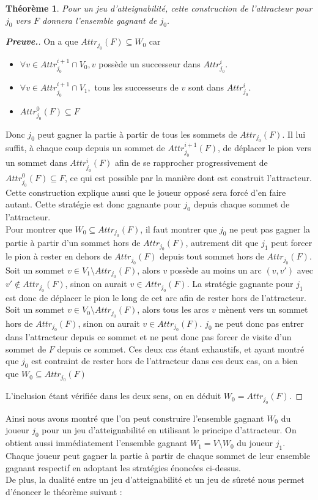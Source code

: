\documentclass[12pt,a4paper,oneside,titlepage]{report}
\newtheorem{thm}{Th\'eor\`eme}[section]
\newenvironment{demonstration}{\begin{proof}[\textnormal{\textbf{Preuve.}}]}{\end{proof}}
\begin{document}
\begin{thm} 
	Pour un jeu d'atteignabilité, cette construction de l'attracteur pour $j_0$ vers $F$ donnera l'ensemble gagnant de $j_0$.
\end{thm}
\begin{demonstration}{
On a que $Attr_{j_0}(F)\subseteq W_0 $ car
\begin{itemize}
\item $\forall v \in Attr_{j_0}^{i+1}\cap V_0, v$ possède un successeur dans $Attr_{j_0}^i$.
\item $\forall v \in Attr_{j_0}^{i+1}\cap V_1,$ tous les successeurs de $v$ sont dans $Attr_{j_0}^i$.
\item $Attr_{j_0}^0(F) \subseteq F$
\end{itemize}
Donc $j_0$ peut gagner la partie à partir de tous les sommets de $Attr_{j_0}(F)$. Il lui suffit, à chaque coup depuis un sommet de $Attr^{i+1}_{j_0}(F)$, de déplacer le pion vers un sommet dans $Attr^{i}_{j_0}(F)$ afin de se rapprocher progressivement de $Attr_{j_0}^0(F) \subseteq F$, ce qui est possible par la manière dont est construit l'attracteur. Cette construction explique aussi que le joueur opposé sera forcé d'en faire autant. Cette stratégie est donc gagnante pour $j_0$ depuis chaque sommet de l'attracteur.\\

\noindent Pour montrer que $W_0\subseteq Attr_{j_0}(F)$, il faut montrer que $j_0$ ne peut pas gagner la partie à partir d'un sommet hors de $Attr_{j_0}(F)$, autrement dit que $j_1$ peut forcer le pion à rester en dehors de $Attr_{j_0}(F)$ depuis tout sommet hors de $Attr_{j_0}(F)$.\\
Soit un sommet $v\in V_1\setminus Attr_{j_0}(F)$, alors $v$ possède au moins un arc $(v, v')$ avec $v'\notin Attr_{j_0}(F)$, sinon on aurait $v \in Attr_{j_0}(F)$. La stratégie gagnante pour $j_1$ est donc de déplacer le pion le long de cet arc afin de rester hors de l'attracteur.\\
Soit  un sommet $v\in V_0\setminus Attr_{j_0}(F)$, alors tous les arcs $v$
mènent vers un sommet hors de $Attr_{j_0}(F)$, sinon on aurait $v \in Attr_{j_0}(F)$. $j_0$ ne peut donc pas entrer dans l'attracteur depuis ce sommet et ne peut donc pas forcer de visite d'un sommet de $F$ depuis ce sommet.
Ces deux cas étant exhaustifs, et ayant montré que $j_0$ est contraint de rester hors de l'attracteur dans ces deux cas, on a bien que $W_0\subseteq Attr_{j_0}(F)$

\noindent L'inclusion étant vérifiée dans les deux sens, on en déduit $W_0 = Attr_{j_0}(F)$.}
\end{demonstration}
Ainsi nous avons montré que l'on peut construire l'ensemble gagnant $W_0$ du joueur $j_0$ pour un jeu d'atteignabilité en utilisant le principe d'attracteur. On obtient aussi immédiatement l'ensemble gagnant $W_1=V\setminus W_0$ du joueur $j_1$. Chaque joueur peut gagner la partie à partir de chaque sommet de leur ensemble gagnant respectif en adoptant les stratégies énoncées ci-dessus.\\
De plus, la dualité entre un jeu d'atteignabilité et un jeu de sûreté nous permet d'énoncer le théorème suivant :
\end{document}
